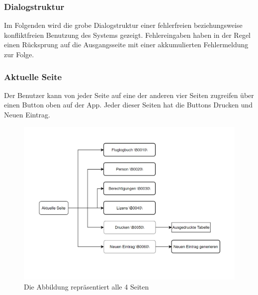 \documentclass[a4paper]{article} %
\begin{document}
    \subsubsection{Dialogstruktur}
    Im Folgenden wird die grobe Dialogstruktur einer fehlerfreien beziehungsweise konfliktfreien Benutzung des Systems gezeigt. Fehlereingaben haben in der Regel einen Rücksprung auf die Ausgangsseite mit einer akkumulierten Fehlermeldung zur Folge.\\
    \subsubsection{Aktuelle Seite}
    Der Benutzer kann von jeder Seite auf eine der anderen vier Seiten zugreifen über einen Button oben auf der App. Jeder dieser Seiten hat die Buttons \glqq{}Drucken\grqq{} und \glqq{}Neuen Eintrag\grqq{}.
    \begin{figure}[h!]
        \centering
        \includegraphics{Benutzeroberflaeche_Floglogbuch.png}
        \caption{Die Abbildung repräsentiert alle 4 Seiten}
        \label{fig:my_label}
    \end{figure}
    \pagebreak
\end{document}
